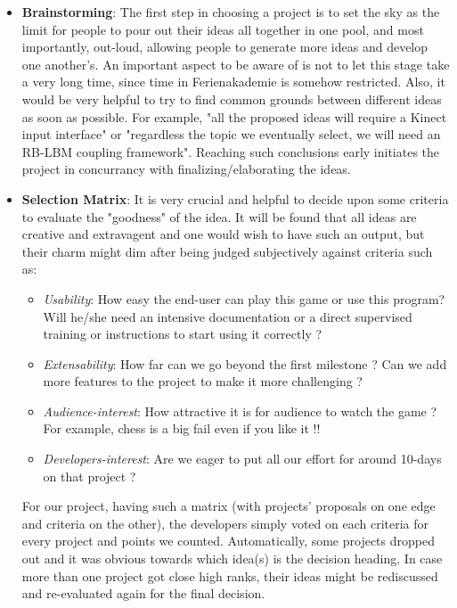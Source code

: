 \begin{itemize}
  \item \textbf{Brainstorming}: The first step in choosing a project is to set the sky as the limit for people to pour out their ideas all together in one pool, and most importantly, out-loud, allowing people to generate more ideas and develop one another's. An important aspect to be aware of is not to let this stage take a very long time, since time in Ferienakademie is somehow restricted. Also, it would be very helpful to try to find common grounds between different ideas as soon as possible. For example, "all the proposed ideas will require a Kinect input interface" or "regardless the topic we eventually select, we will need an RB-LBM coupling framework". Reaching such conclusions early initiates the project in concurrancy with finalizing/elaborating the ideas.
  
  \item \textbf{Selection Matrix}: It is very crucial and helpful to decide upon some criteria to evaluate the "goodness" of the idea. It will be found that all ideas are creative and extravagent and one would wish to have such an output, but their charm might dim after being judged subjectively against criteria such as:
  \begin{itemize}
    \item \textit{Usability}: How easy the end-user can play this game or use this program? Will he/she need an intensive documentation or a direct supervised training or instructions to start using it correctly ?
    \item \textit{Extensability}: How far can we go beyond the first milestone ? Can we add more features to the project to make it more challenging ?
    \item \textit{Audience-interest}: How attractive it is for audience to watch the game ? For example, chess is a big fail even if you like it !!
    \item \textit{Developers-interest}: Are we eager to put all our effort for around 10-days on that project ?
  \end{itemize}
  For our project, having such a matrix (with projects' proposals on one edge and criteria on the other), the developers simply voted on each criteria for every project and points we counted. Automatically, some projects dropped out and it was obvious towards which idea(s) is the decision heading. In case more than one project got close high ranks, their ideas might be rediscussed and re-evaluated again for the final decision.
\end{itemize}


